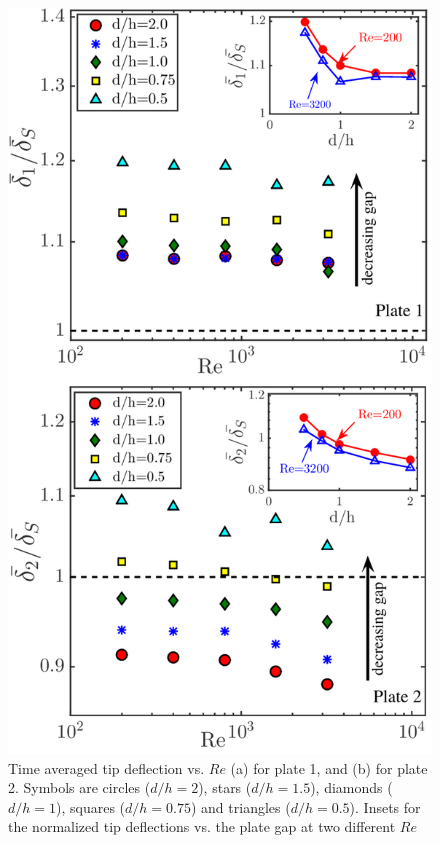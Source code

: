 \documentclass[aps,pre,twocolumn,aps,longbibliography]{revtex4-1}
\begin{document}
	
	\begin{figure}
		\begin{minipage}[c]{0.80\linewidth}
			\includegraphics[width=1\linewidth]{Fig06.pdf} 
		\end{minipage} 
		\caption{Time averaged tip deflection vs. $Re$ (a) for plate 1, and (b) for plate 2. Symbols are circles ($d/h=2$), stars ($d/h=1.5$), diamonds ($d/h=1$), squares ($d/h=0.75$) and triangles ($d/h=0.5$). Insets for the normalized tip deflections vs. the plate gap at two different $Re$}
		\label{fig:steady_double_vs_Re}
	\end{figure} 
	
\end{document}
